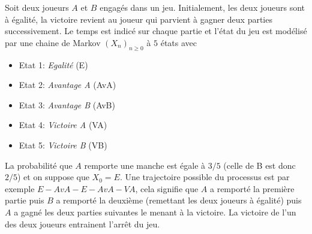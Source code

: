 \documentclass[11pt, addpoints, answers]{exam}
\begin{document}
\begin{questions}
\question Soit deux joueurs $A$ et $B$ engagés dans un jeu. Initialement, les deux joueurs sont à égalité, la victoire revient au joueur qui parvient à gagner deux parties successivement. Le temps est indicé sur chaque partie et l'état du jeu est modélisé par une chaine de Markov $(X_n)_{n\geq0}$ à $5$ états avec 
\begin{itemize}
	\item Etat 1: \textit{Egalité} (E)
	\item Etat 2: \textit{Avantage A} (AvA)
	\item Etat 3: \textit{Avantage B} (AvB)
  \item Etat 4: \textit{Victoire A} (VA)
	\item Etat 5: \textit{Victoire B} (VB)
\end{itemize}
La probabilité que $A$ remporte une manche est égale à $3/5$ (celle de B est donc $2/5$) et on suppose que $X_0 = E$. Une trajectoire possible du processus est par exemple $E-AvA-E-AvA-VA$, cela signifie que $A$ a remporté la première partie puis $B$ a remporté la deuxième (remettant les deux joueurs à égalité) puis $A$ a gagné les deux parties suivantes le menant à la victoire. La victoire de l'un des deux joueurs entrainent l'arrêt du jeu.
\end{questions}
\end{document}
